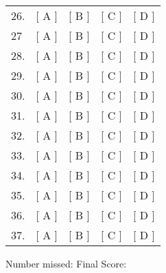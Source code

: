 \documentclass[addpoints,9pt]{exam}
\begin{document}
\begin{multicols}{2}
\begin{tabular}{lcccc}\\
  26. & [ A ] & [ B ] & [ C ] & [ D ] \\
  27 & [ A ] & [ B ] & [ C ] & [ D ] \\
  28. & [ A ] & [ B ] & [ C ] & [ D ] \\
  29. & [ A ] & [ B ] & [ C ] & [ D ] \\
  30. & [ A ] & [ B ] & [ C ] & [ D ] \\
  31. & [ A ] & [ B ] & [ C ] & [ D ] \\
  32. & [ A ] & [ B ] & [ C ] & [ D ] \\
  33. & [ A ] & [ B ] & [ C ] & [ D ] \\
  34. & [ A ] & [ B ] & [ C ] & [ D ] \\
  35. & [ A ] & [ B ] & [ C ] & [ D ] \\
  36. & [ A ] & [ B ] & [ C ] & [ D ] \\
  37. & [ A ] & [ B ] & [ C ] & [ D ] \\
\end{tabular}


\end{multicols}

\fi

\vspace{.2in}

Number missed: \makebox[.5in]{\hrulefill} Final Score: \makebox[.5in]{\hrulefill}
\end{document}
